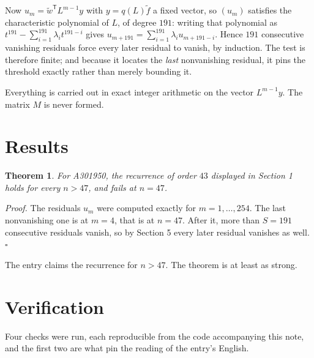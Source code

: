 \documentclass[11pt]{article}
\newtheorem{theorem}{Theorem}
\theoremstyle{definition}
\begin{document}
Now $u_m = \tilde w^{\mathsf T} L^{m-1} y$ with $y = q(L)\tilde f$ a fixed vector, so $(u_m)$ satisfies the characteristic polynomial of $L$, of degree $191$: writing that polynomial as $t^{191} - \sum_{i=1}^{191} \lambda_i t^{191-i}$ gives $u_{m+191} = \sum_{i=1}^{191} \lambda_i u_{m+191-i}$. Hence $191$ consecutive vanishing residuals force every later residual to vanish, by induction. The test is therefore finite; and because it locates the {\itshape last} nonvanishing residual, it pins the threshold exactly rather than merely bounding it.

Everything is carried out in exact integer arithmetic on the vector $L^{m-1}y$. The matrix $M$ is never formed.

\section{Results}

\begin{theorem} For A301950, the recurrence of order $43$ displayed in Section 1 holds for every $n > 47$, and fails at $n = 47$.\end{theorem}

{\itshape Proof.} The residuals $u_m$ were computed exactly for $m = 1,\dots,254$. The last nonvanishing one is at $m = 4$, that is at $n = 47$. After it, more than $S = 191$ consecutive residuals vanish, so by Section 5 every later residual vanishes as well. $\square$

The entry claims the recurrence for $n > 47$. The theorem is at least as strong.

\section{Verification}

Four checks were run, each reproducible from the code accompanying this note, and the first two are what pin the reading of the entry's English.
\end{document}
